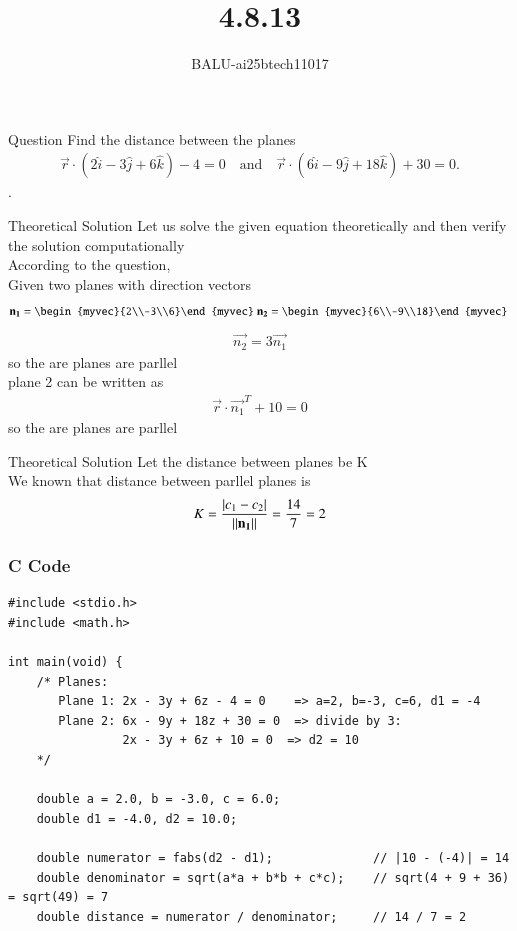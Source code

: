 \documentclass{beamer}
\title %
{4.8.13}
\author %
{BALU-ai25btech11017}
\begin{document}
\frame{\titlepage}
\begin{frame}{Question}
 Find the distance between the planes 
\begin{align}
\vec{r} \cdot (2\hat{i} - 3\hat{j} + 6\hat{k}) - 4 = 0
\quad \text{and} \quad
\vec{r} \cdot (6\hat{i} - 9\hat{j} + 18\hat{k}) + 30 = 0.
\end{align}
.\\ 
\end{frame}
\begin{frame}{Theoretical Solution}
Let us solve the given equation theoretically and then verify the solution computationally \\
According to the question, \\
Given two planes with direction vectors\\
\begin{align}
\vec{n_1}=\begin{myvec}{2\\-3\\6}\end{myvec}\
\vec{n_2}=\begin{myvec}{6\\-9\\18}\end{myvec}\
\end{align}
\begin{align}
    \vec{n_2}=3\vec{n_1}
\end{align}
so the are planes are parllel\\
plane 2 can be written as\\
\begin{align}
    \vec{r}\cdot\vec{n_1}^T+10=0
\end{align}
so the are planes are parllel\\

\end{frame}
\begin{frame}{Theoretical Solution}
Let the distance between planes be K\\
We known that distance between parllel planes is
\begin{align}
K=\frac{\left\vert c_1-c_2\right\vert}{\|\mathbf{n_1}\|}=\frac{14}{7}=2
\end{align}
\end{frame}
\begin{frame}[fragile]
    \frametitle{C Code}
    \begin{lstlisting}
#include <stdio.h>
#include <math.h>

int main(void) {
    /* Planes:
       Plane 1: 2x - 3y + 6z - 4 = 0    => a=2, b=-3, c=6, d1 = -4
       Plane 2: 6x - 9y + 18z + 30 = 0  => divide by 3:
                2x - 3y + 6z + 10 = 0  => d2 = 10
    */

    double a = 2.0, b = -3.0, c = 6.0;
    double d1 = -4.0, d2 = 10.0;

    double numerator = fabs(d2 - d1);              // |10 - (-4)| = 14
    double denominator = sqrt(a*a + b*b + c*c);    // sqrt(4 + 9 + 36) = sqrt(49) = 7
    double distance = numerator / denominator;     // 14 / 7 = 2

     \end{lstlisting}
\end{frame}
\end{document}

